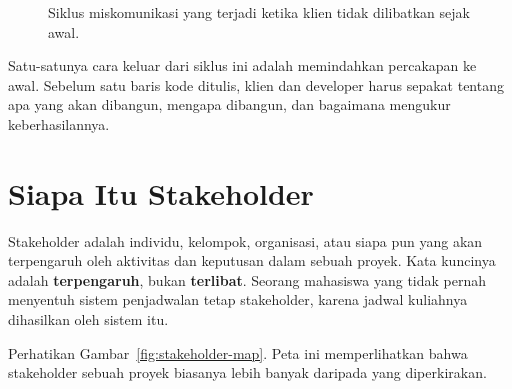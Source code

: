 \documentclass[11pt,a4paper]{article}
\begin{document}
\begin{figure}[H]
	\centering
	\caption{Siklus miskomunikasi yang terjadi ketika klien tidak dilibatkan sejak awal.}
	\label{fig:loop}
\end{figure}

Satu-satunya cara keluar dari siklus ini adalah memindahkan percakapan ke awal. Sebelum satu baris kode ditulis, klien dan developer harus sepakat tentang apa yang akan dibangun, mengapa dibangun, dan bagaimana mengukur keberhasilannya.

\section{Siapa Itu Stakeholder}

Stakeholder adalah individu, kelompok, organisasi, atau siapa pun yang akan terpengaruh oleh aktivitas dan keputusan dalam sebuah proyek. Kata kuncinya adalah \textbf{terpengaruh}, bukan \textbf{terlibat}. Seorang mahasiswa yang tidak pernah menyentuh sistem penjadwalan tetap stakeholder, karena jadwal kuliahnya dihasilkan oleh sistem itu.

Perhatikan Gambar~\ref{fig:stakeholder-map}. Peta ini memperlihatkan bahwa stakeholder sebuah proyek biasanya lebih banyak daripada yang diperkirakan.
\end{document}
